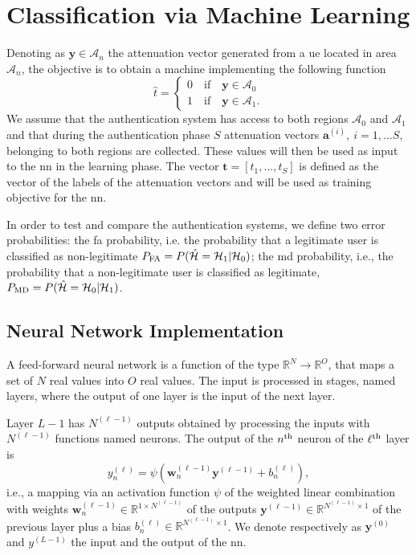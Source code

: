 \documentclass[conference]{IEEEtran}
\begin{document}
\section{Classification via Machine Learning}\label{sec: ml}
Denoting as $\bm{y}\in \mathcal{A}_n$ the attenuation vector generated from a \ac{ue} located in area $\mathcal{A}_{n}$, the objective is to obtain a machine implementing the following function
\begin{equation}
  \hat{t} =
  \begin{cases}
  0 \quad \text{if} \quad \bm{y} \in \mathcal{A}_0\\
  1 \quad \text{if} \quad \bm{y} \in \mathcal{A}_1.
  \end{cases}
\end{equation}
We assume that the authentication system has access to both regions $\mathcal{A}_0$ and $\mathcal{A}_1$ and that during the authentication phase $S$ attenuation vectors $\bm{a}^{(i)}, \ i=1,\dots S$,  belonging to both regions are collected. These values will then be used as input to the \ac{nn} in the learning phase. The vector $\bm{t}=[t_1,...,t_S]$ is defined as the vector of the labels of the attenuation vectors and will be used as training objective for the \ac{nn}.

In order to test and compare the authentication systems, we define two error probabilities: the \ac{fa} probability, i.e. the probability  that a legitimate user is classified as non-legitimate $P_{\rm FA} =P(\hat{\mathcal H} = \mathcal H_1 | \mathcal H_0)$; the \ac{md} probability, i.e., the probability that a non-legitimate user is classified as legitimate, $P_{\rm MD}=P(\hat{\mathcal H} = \mathcal H_0 | \mathcal H_1)$.

\subsection{Neural Network Implementation}\label{sec:nn}
A feed-forward neural network is a function of the type $\mathbb{R}^N \to \mathbb{R}^O$, that maps a set of $N$ real values into $O$ real values. The input is processed in stages, named layers, where the output of one layer is the input of the next layer.

Layer $L-1$ has $N^{(\ell-1)}$ outputs obtained by processing the inputs with $N^{(\ell-1)}$ functions named neurons. The output of the $n^{\rm th}$ neuron of the $\ell^{\rm th}$ layer is
\begin{equation}\label{eq:nonLin}
y_n^{(\ell)} = \psi\left( \bm{w}_n^{(\ell -1)}\bm{y}^{(\ell-1)}+b_n^{(\ell)} \right),
\end{equation}
i.e., a mapping via an activation function $\psi$ of the weighted linear combination with weights $\bm{w}_n^{(\ell -1)}\in \mathbb{R}^{1\times N^{(\ell-1)}}$ of the outputs $\bm{y}^{(\ell-1)} \in \mathbb{R}^{N^{(\ell-1)} \times 1 }$ of the previous layer plus a bias $b_n^{(\ell)} \in \mathbb{R}^{N^{(\ell-1)} \times 1 }$. We denote respectively as $\bm{y}^{(0)}$ and $y^{(L-1)}$ the input and the output of the \ac{nn}. 
\end{document}
